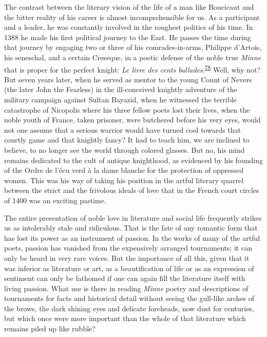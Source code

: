 The contrast between the literary vision of the life of a man like
Boucicaut and the bitter reality of his career is almost
incomprehensible for us. As a participant and a leader, he was
constantly involved in the roughest politics of his time. In 1388 he
made his first political journey to the East. He passes the time during
that journey by engaging two or three of his comrades-in-arms, Philippe
d'Artois, his seneschal, and a certain Creseque, in a poetic defense of
the noble true \emph{Minne} that is proper for the perfect knight:
\emph{Le livre des cents
ballades}.\textsuperscript{\protect\hypertarget{10_Chapter_Three__THE_HEROIC_DREAM.xhtmlux5cux23id_1778}{\protect\hyperlink{23_NOTES.xhtmlux5cux23id_1779}{78}}}
Well, why not? But seven years later, when he served as mentor to the
young Count of Nevers (the later John the Fearless) in the ill-conceived
knightly adventure of the military campaign against Sultan Bayazid, when
he witnessed the terrible catastrophe of Nicopolis where his three
fellow poets lost their lives, when the noble youth of France, taken
prisoner, were butchered before his very eyes, would not one assume that
a serious warrior would have turned cool towards that courtly game and
that knightly fancy? It had to teach him, we are inclined to believe, to
no longer see the world through colored glasses. But no, his mind
remains dedicated to the cult of antique knighthood, as evidenced by his
founding of the Ordre de l'écu verd à la dame blanche for the protection
of oppressed women. This was his way of taking his position in the
artful literary quarrel between the strict and the frivolous ideals of
love that in the French court circles of 1400 was an exciting pastime.

The entire presentation of noble love in literature and social life
frequently strikes us as intolerably stale and ridiculous. That is the
fate of any romantic form that has lost its power as an instrument of
passion. In the works of many of the artful poets, passion has vanished
from the expensively arranged tournaments; it can only be heard in very
rare voices. But the importance of all this, given that it was inferior
as literature or art, as a beautification of life or
\protect\hypertarget{10_Chapter_Three__THE_HEROIC_DREAM.xhtmlux5cux23page_87}{}{}as
an expression of sentiment can only be fathomed if one can again fill
the literature itself with living passion. What use is there in reading
\emph{Minne} poetry and descriptions of tournaments for facts and
historical detail without seeing the gull-like arches of the brows, the
dark shining eyes and delicate foreheads, now dust for centuries, but
which once were more important than the whole of that literature which
remains piled up like rubble?

